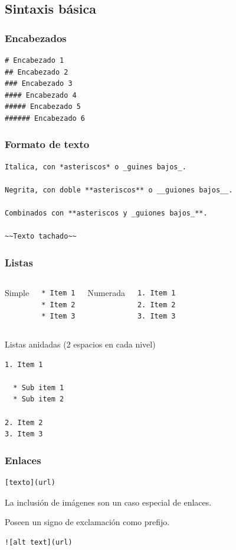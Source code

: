 \documentclass[svgnames]{beamer}
\begin{document}
\subsection{Sintaxis básica}

\begin{frame}[fragile]
  \frametitle{Encabezados}
  \begin{lstlisting}[style=md]
# Encabezado 1
## Encabezado 2
### Encabezado 3
#### Encabezado 4
##### Encabezado 5
###### Encabezado 6
  \end{lstlisting}
\end{frame}

\begin{frame}[fragile]
  \frametitle{Formato de texto}
  \begin{lstlisting}[style=md]
Italica, con *asteriscos* o _guines bajos_.

Negrita, con doble **asteriscos** o __guiones bajos__.

Combinados con **asteriscos y _guiones bajos_**.

~~Texto tachado~~
  \end{lstlisting}
\end{frame}

\begin{frame}[fragile]
  \frametitle{Listas}
  \begin{columns}
      Simple
      \begin{lstlisting}[style=md]
* Item 1
* Item 2
* Item 3
      \end{lstlisting}\pause
      Numerada
      \begin{lstlisting}[style=md]
1. Item 1
2. Item 2
3. Item 3
      \end{lstlisting}
  \end{columns}\pause
  \vfill
  Listas anidadas (2 espacios en cada nivel)
    \begin{lstlisting}[style=md]
1. Item 1

  * Sub item 1
  * Sub item 2

2. Item 2
3. Item 3
\end{lstlisting}
\end{frame}

\begin{frame}[fragile]
  \frametitle{Enlaces}
  \begin{lstlisting}[style=md]
[texto](url)
  \end{lstlisting}\pause
  \vfill
  La inclusión de imágenes son un caso especial de enlaces.

  Poseen un signo de exclamación como prefijo.

  \begin{lstlisting}[style=md]
![alt text](url)
  \end{lstlisting}
\end{frame}
\end{document}
